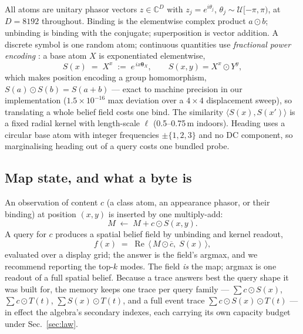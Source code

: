\documentclass[conference]{IEEEtran}
\newcommand{\bnd}{\odot}
\newcommand{\conj}[1]{\overline{#1}}
\begin{document}
All atoms are unitary phasor vectors $z \in \mathbb{C}^{D}$ with
$z_j = e^{i\theta_j}$, $\theta_j \sim \mathcal{U}[-\pi,\pi)$, at
$D=8192$ throughout. Binding is the elementwise complex product
$a \bnd b$; unbinding is binding with the conjugate; superposition is
vector addition. A discrete symbol is one random atom; continuous
quantities use \emph{fractional power encoding} \cite{komer2019neural}:
a base atom $X$ is exponentiated elementwise,
\begin{equation}
S(x) \;=\; X^{x} \;:=\; e^{\,i x \boldsymbol{\theta}_X}, \qquad
S(x,y) = X^{x} \bnd Y^{y},
\label{eq:fpe}
\end{equation}
which makes position encoding a group homomorphism,
$S(a) \bnd S(b) = S(a+b)$ --- exact to machine precision in our
implementation ($1.5\times10^{-16}$ max deviation over a $4\times4$
displacement sweep), so translating a whole belief field costs one bind.
The similarity $\langle S(x), S(x')\rangle$ is a fixed radial kernel with
length-scale $\ell$ (0.5--0.75\,m indoors). Heading uses a circular base
atom with integer frequencies $\pm\{1,2,3\}$ and no DC component, so
marginalising heading out of a query costs one bundled probe.

\subsection{Map state, and what a byte is}
\label{sec:traces}

An observation of content $c$ (a class atom, an appearance phasor, or
their binding) at position $(x,y)$ is inserted by one multiply-add:
\begin{equation}
M \;\leftarrow\; M + c \bnd S(x,y).
\label{eq:insert}
\end{equation}
A query for $c$ produces a spatial belief field by unbinding and kernel
readout,
\begin{equation}
f(x) \;=\; \operatorname{Re}\,\langle\, M \bnd \conj{c},\; S(x)\,\rangle,
\label{eq:field}
\end{equation}
evaluated over a display grid; the answer is the field's argmax, and we
recommend reporting the top-$k$ modes. The field \emph{is} the map;
argmax is one readout of a full spatial belief. Because a trace answers
best the query shape it was built for, the memory keeps one trace per
query family --- $\sum c \bnd S(x)$, $\sum c \bnd T(t)$,
$\sum S(x) \bnd T(t)$, and a full event trace $\sum c \bnd S(x) \bnd T(t)$
--- in effect the algebra's secondary indexes, each carrying its own
capacity budget under Sec.~\ref{sec:law}.
\end{document}
